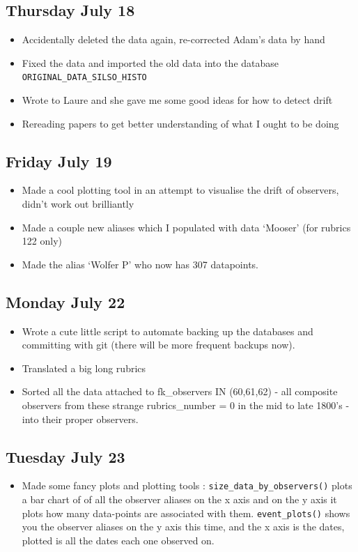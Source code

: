 \documentclass[12pt]{article}
\begin{document}
\subsection{Thursday July 18}
\begin{itemize}
    \item Accidentally deleted the data again, re-corrected Adam's data by hand
    \item Fixed the data and imported the old data into the database \texttt{ORIGINAL\_DATA\_SILSO\_HISTO}
    \item Wrote to Laure and she gave me some good ideas for how to detect drift
    \item Rereading papers to get better understanding of what I ought to be doing
\end{itemize}

\subsection{Friday July 19}
\begin{itemize}
    \item Made a cool plotting tool in an attempt to visualise the drift of observers, didn't work out brilliantly
    \item Made a couple new aliases which I populated with data `Mooser' (for rubrics 122 only)
    \item Made the alias `Wolfer P' who now has 307 datapoints.
\end{itemize}

\subsection{Monday July 22}
\begin{itemize}
    \item Wrote a cute little script to automate backing up the databases and committing with git (there will be more frequent backups now).
    \item Translated a big long rubrics
    \item Sorted all the data attached to fk\_observers IN (60,61,62) - all composite observers from these strange rubrics\_number = 0 in the mid to late 1800's - into their proper observers.
\end{itemize}

\subsection{Tuesday July 23}
\begin{itemize}
    \item Made some fancy plots and plotting tools : \texttt{size\_data\_by\_observers()} plots a bar chart of of all the observer aliases on the x axis and on the y axis it plots how many data-points are associated with them. \texttt{event\_plots()} shows you the observer aliases on the y axis this time, and the x axis is the dates, plotted is all the dates each one observed on.
\end{itemize}
\end{document}
